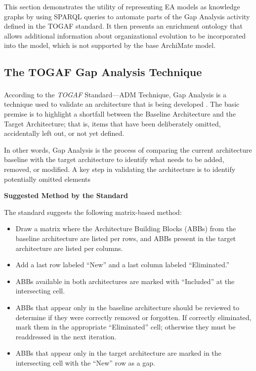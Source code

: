 This section demonstrates the utility of representing EA models as knowledge graphs by using SPARQL queries to automate parts of the Gap Analysis activity defined in the TOGAF standard. It then presents an enrichment ontology that allows additional information about organizational evolution to be incorporated into the model, which is not supported by the base ArchiMate model.

\subsection{The TOGAF Gap Analysis Technique}
\label{subsec:togaf-gap}

According to the \textit{TOGAF}\textsuperscript{\textregistered} Standard---ADM Technique, Gap Analysis is a technique used to validate an architecture that is being developed \parencite{opengroup2022togaf}. The basic premise is to highlight a shortfall between the Baseline Architecture and the Target Architecture; that is, items that have been deliberately omitted, accidentally left out, or not yet defined.

In other words, Gap Analysis is the process of comparing the current architecture baseline with the target architecture to identify what needs to be added, removed, or modified. A key step in validating the architecture is to identify potentially omitted elements

\noindent\textbf{Suggested Method by the Standard}\par

The standard suggests the following matrix-based method:

\begin{itemize}
    \item Draw a matrix where the Architecture Building Blocks (ABBs) from the baseline architecture are listed per rows, and ABBs present in the target architecture are listed per columns.
    \item Add a last row labeled ``New'' and a last column labeled ``Eliminated.''
    \item ABBs available in both architectures are marked with ``Included'' at the intersecting cell.
    \item ABBs that appear only in the baseline architecture should be reviewed to determine if they were correctly removed or forgotten. If correctly eliminated, mark them in the appropriate ``Eliminated'' cell; otherwise they must be readdressed in the next iteration.
    \item ABBs that appear only in the target architecture are marked in the intersecting cell with the ``New'' row as a gap.
\end{itemize}

